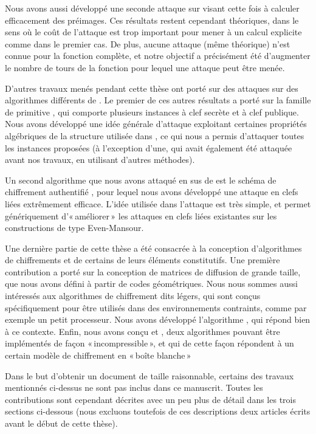 Nous avons aussi développé une seconde attaque sur \shaone visant cette fois à calculer efficacement des préimages. Ces résultats restent cependant théoriques, dans le sens où le coût
de l'attaque est trop important pour mener à un calcul explicite comme dans le premier cas. De plus, aucune attaque (même théorique) n'est connue pour la fonction complète, et notre
objectif a précisément été d'augmenter le nombre de tours de la fonction pour lequel une attaque peut être menée.

\medskip

D'autres travaux menés pendant cette thèse ont porté sur des attaques sur des algorithmes différents de \shaone. Le premier de ces autres résultats a porté sur la famille de primitive
\asasa, qui comporte plusieurs instances à clef secrète et à clef publique. Nous avons développé une idée générale d'attaque exploitant certaines propriétés algébriques de la
structure utilisée dans \asasa, ce qui nous a permis d'attaquer toutes les instances proposées (à l'exception d'une, qui avait également été attaquée avant nos travaux, en utilisant
d'autres méthodes).

Un second algorithme que nous avons attaqué en sus de \shaone est le schéma de chiffrement authentifié \proestotr, pour lequel nous avons développé une attaque en clefs liées
extrêmement efficace. L'idée utilisée dans l'attaque est très simple, et permet génériquement d'«\,améliorer\,» les attaques en clefs liées existantes sur les constructions
de type Even-Mansour.

\medskip

Une dernière partie de cette thèse a été consacrée à la conception d'algorithmes de chiffrements et de certains de leurs éléments constitutifs.
Une première contribution a porté sur la conception de matrices de diffusion de grande taille, que nous avons défini à partir de codes géométriques.
Nous nous sommes aussi intéressés aux algorithmes de chiffrement dits légers, qui sont conçus spécifiquement pour être utilisés dans des environnements
contraints, comme par exemple un petit processeur. Nous avons développé l'algorithme \fly, qui répond bien à ce contexte.
Enfin, nous avons conçu \pc et \cdb, deux algorithmes pouvant être implémentés de façon «\,incompressible\,», et qui de cette façon répondent à un certain modèle
de chiffrement en «\,boîte blanche\,» 

\bigskip

Dans le but d'obtenir un document de taille raisonnable, certains des travaux mentionnés ci-dessus ne sont pas inclus dans ce manuscrit. Toutes les contributions sont cependant
décrites avec un peu plus de détail dans les trois sections ci-dessous (nous excluons toutefois de ces descriptions deux articles écrits avant le début de cette thèse).

